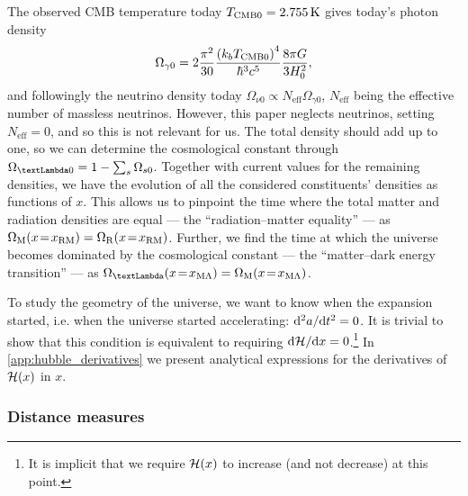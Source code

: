 The observed CMB temperature today $\TCMB=2.755\, \mathrm{K}$ gives today's photon density
\begin{equation}
    \Omega_{\gamma 0} = 2 \frac{\pi^2}{30} \frac{\left( k_b \TCMB \right) ^4}{\hbar^3 c^5}  \frac{8\pi G}{3H_0^2},
\end{equation}
and followingly the neutrino density today $\Omega_{\nu 0} \propto N_\mathrm{eff} \Omega_{\gamma 0}$, $N_\mathrm{eff}$ being the effective number of massless neutrinos. However, this paper neglects neutrinos, setting $N_\mathrm{eff}=0$, and so this is not relevant for us. The total density should add up to one, so we can determine the cosmological constant through $\OmgL = 1-\sum_{s} \Omega_{s0}$. Together with current values for the remaining densities, we have the evolution of all the considered constituents' densities as functions of $x$. This allows us to pinpoint the time where the total matter and radiation densities are equal --- the ``radiation--matter equality'' --- as $\OmgM[](x\!=\!x_\mathrm{RM}) = \OmgR[](x\!=\!x_\mathrm{RM})$. Further, we find the time at which the universe becomes dominated by the cosmological constant --- the ``matter--dark energy transition'' --- as $\OmgL[](x\!=\!x_{\mathrm{M}\Lambda}) = \OmgM[](x\!=\!x_{\mathrm{M}\Lambda})$. 


To study the geometry of the universe, we want to know when the expansion started, i.e. when the universe started accelerating: $\D^2 a / \D t^2 = 0$. It is trivial to show that this condition is equivalent to requiring $\D \Hp/\D x = 0$.\footnote{It is implicit that we require $\Hp(x)$ to increase (and not decrease) at this point.} In \cref{app:hubble_derivatives} we present analytical expressions for the derivatives of $\Hp(x)$ in $x$.


\subsubsection{Distance measures}